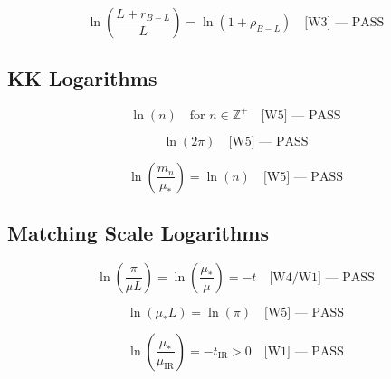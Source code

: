\documentclass[11pt,a4paper]{article}
\theoremstyle{definition}
\begin{document}
\begin{equation}
\label{eq:log_bkt_3}
\ln\left(\frac{L + r_{B-L}}{L}\right) = \ln(1 + \rho_{B-L}) \quad \text{[W3] — PASS}
\end{equation}

\subsection{KK Logarithms}
\label{subsec:kk_logs}

\begin{equation}
\label{eq:log_kk_1}
\ln(n) \quad \text{for } n \in \mathbb{Z}^+ \quad \text{[W5] — PASS}
\end{equation}

\begin{equation}
\label{eq:log_kk_2}
\ln(2\pi) \quad \text{[W5] — PASS}
\end{equation}

\begin{equation}
\label{eq:log_kk_3}
\ln\left(\frac{m_n}{\mu_*}\right) = \ln(n) \quad \text{[W5] — PASS}
\end{equation}

\subsection{Matching Scale Logarithms}
\label{subsec:matching_logs}

\begin{equation}
\label{eq:log_match_1}
\ln\left(\frac{\pi}{\mu L}\right) = \ln\left(\frac{\mu_*}{\mu}\right) = -t \quad \text{[W4/W1] — PASS}
\end{equation}

\begin{equation}
\label{eq:log_match_2}
\ln(\mu_* L) = \ln(\pi) \quad \text{[W5] — PASS}
\end{equation}

\begin{equation}
\label{eq:log_match_3}
\ln\left(\frac{\mu_*}{\mu_{\text{IR}}}\right) = -t_{\text{IR}} > 0 \quad \text{[W1] — PASS}
\end{equation}

\end{document}
